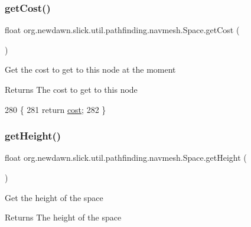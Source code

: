 \subsubsection{\texorpdfstring{get\+Cost()}{getCost()}}
{\footnotesize\ttfamily float org.\+newdawn.\+slick.\+util.\+pathfinding.\+navmesh.\+Space.\+get\+Cost (\begin{DoxyParamCaption}{ }\end{DoxyParamCaption})\hspace{0.3cm}{\ttfamily [inline]}}

Get the cost to get to this node at the moment

\begin{DoxyReturn}{Returns}
The cost to get to this node 
\end{DoxyReturn}

\begin{DoxyCode}
280                            \{
281         \textcolor{keywordflow}{return} \mbox{\hyperlink{classorg_1_1newdawn_1_1slick_1_1util_1_1pathfinding_1_1navmesh_1_1_space_a9807ff26ac70231463426ebbaf4b8dac}{cost}};
282     \}
\end{DoxyCode}
\mbox{\label{classorg_1_1newdawn_1_1slick_1_1util_1_1pathfinding_1_1navmesh_1_1_space_a939d5c6408a97ae48780988d3194427e}} 
\subsubsection{\texorpdfstring{get\+Height()}{getHeight()}}
{\footnotesize\ttfamily float org.\+newdawn.\+slick.\+util.\+pathfinding.\+navmesh.\+Space.\+get\+Height (\begin{DoxyParamCaption}{ }\end{DoxyParamCaption})\hspace{0.3cm}{\ttfamily [inline]}}

Get the height of the space

\begin{DoxyReturn}{Returns}
The height of the space 
\end{DoxyReturn}

